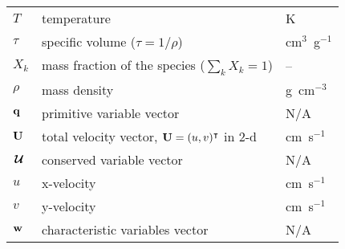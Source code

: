 \begin{center}
\begin{longtable}{|l|p{4.0in}|l|}
%
$T$     & temperature                                & K \\
%
$\tau$  & specific volume ($\tau = 1/\rho$)          & cm$^3$~g$^{-1}$ \\
%
$X_k$   & mass fraction of the species ($\sum_k X_k = 1$) & -- \\
%
$\rho$  & mass density  & g~cm$^{-3}$ \\
%
${\bf q}$     & primitive variable vector                 & N/A \\
%
${\bf U}$   & total velocity vector, ${\bf U} = (u, v)^\intercal$ in 2-d & cm~s$^{-1}$ \\
%
${\,\boldsymbol{\mathcal{U}}}$   & conserved variable vector & N/A \\
%
$u$     & x-velocity   & cm~s$^{-1}$ \\
%
$v$     & y-velocity   & cm~s$^{-1}$ \\
%
${\bf w}$     & characteristic variables vector                   & N/A \\
%
\end{longtable}
\end{center}
\renewcommand{\arraystretch}{1.0}


